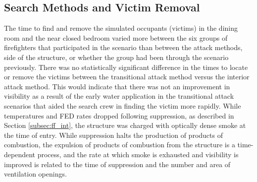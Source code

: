\documentclass[12pt,oneside]{article}
\begin{document}
\subsection{Search Methods and Victim Removal}
\label{subsec:search}
The time to find and remove the simulated occupants (victims) in the dining room and the near closed bedroom varied more between the six groups of firefighters that participated in the scenario than between the attack methods, side of the structure, or whether the group had been through the scenario previously. There was no statistically significant difference in the times to locate or remove the victims between the transitional attack method versus the interior attack method. This would indicate that there was not an improvement in visibility as a result of the early water application in the transitional attack scenarios that aided the search crew in finding the victim more rapidly. While temperatures and FED rates dropped following suppression, as described in Section \ref{subsec:ff_int}, the structure was charged with optically dense smoke at the time of entry. While suppression halts the production of products of combustion, the expulsion of products of combustion from the structure is a time-dependent process, and the rate at which smoke is exhausted and visibility is improved is related to the time of suppression and the number and area of ventilation openings.
\end{document}
